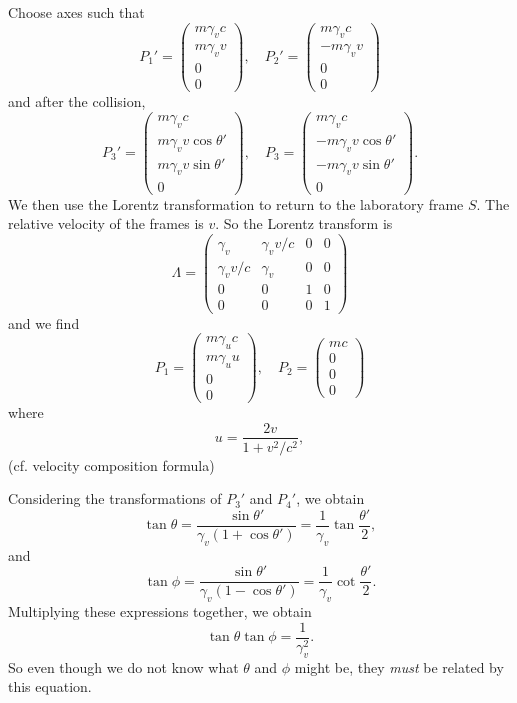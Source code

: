 \documentclass[a4paper]{article}
\begin{document}
Choose axes such that
\[
  P_1' =
  \begin{pmatrix}
    m\gamma_v c\\
    m\gamma_v v\\
    0\\
    0
  \end{pmatrix},\quad
  P_2' =
  \begin{pmatrix}
    m\gamma_v c\\
    -m\gamma_v v\\
    0\\
    0
  \end{pmatrix}
\]
and after the collision,
\[
  P_3' =
  \begin{pmatrix}
    m\gamma_v c\\
    m\gamma_v v\cos \theta'\\
    m\gamma_v v\sin \theta'\\
    0
  \end{pmatrix},\quad
  P_3 =
  \begin{pmatrix}
    m\gamma_v c\\
    -m\gamma_v v\cos \theta'\\
    -m \gamma_v v\sin \theta'\\
    0
  \end{pmatrix}.
\]
We then use the Lorentz transformation to return to the laboratory frame $S$. The relative velocity of the frames is $v$. So the Lorentz transform is
\[
  \Lambda =
  \begin{pmatrix}
    \gamma_v & \gamma_v v/c & 0 & 0\\
    \gamma_v v/c & \gamma_v & 0 & 0\\
    0 & 0 & 1 & 0\\
    0 & 0 & 0 & 1
  \end{pmatrix}
\]
and we find
\[
  P_1 =
  \begin{pmatrix}
    m\gamma_u c\\
    m\gamma_u u\\
    0\\
    0
  \end{pmatrix},\quad
  P_2 =
  \begin{pmatrix}
    mc\\
    0\\
    0\\
    0
  \end{pmatrix}
\]
where
\[
  u = \frac{2v}{1 + v^2/c^2},
\]
(cf. velocity composition formula)

Considering the transformations of $P_3'$ and $P_4'$, we obtain
\[
  \tan \theta = \frac{\sin \theta'}{\gamma_v (1 + \cos \theta')} = \frac{1}{\gamma_v}\tan \frac{\theta'}{2},
\]
and
\[
  \tan \phi = \frac{\sin \theta'}{\gamma_v(1 - \cos \theta')} = \frac{1}{\gamma_v}\cot \frac{\theta'}{2}.
\]
Multiplying these expressions together, we obtain
\[
  \tan \theta\tan \phi = \frac{1}{\gamma_v^2}.
\]
So even though we do not know what $\theta$ and $\phi$ might be, they \emph{must} be related by this equation.
\end{document}
